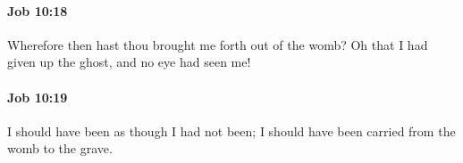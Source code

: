 		\paragraph{Job 10:18} %
			\label{JOB-10-18}

			Wherefore then hast thou brought me forth out of the womb? Oh that I had given up the ghost, and no eye had seen me!


		\paragraph{Job 10:19} %
			\label{JOB-10-19}

			I should have been as though I had not been; I should have been carried from the womb to the grave.


